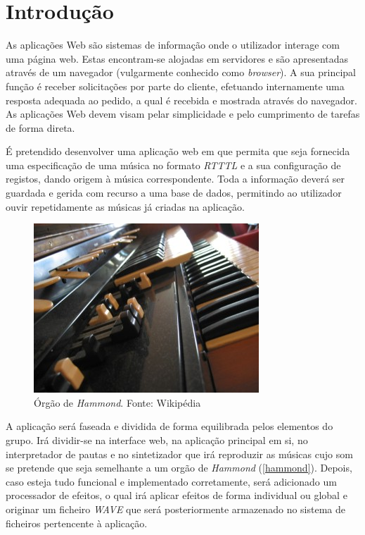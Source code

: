 \documentclass[11pt,openany,twoside]{report}
\begin{document}
\chapter{Introdução}
As aplicações Web são sistemas de informação onde o utilizador interage com uma página web. Estas encontram-se alojadas em servidores e são apresentadas através de um navegador (vulgarmente conhecido como \textit{browser}). A sua principal função é receber solicitações por parte do cliente, efetuando internamente uma resposta adequada ao pedido, a qual é recebida e mostrada através do navegador. As aplicações Web devem visam pelar simplicidade e pelo cumprimento de tarefas de forma direta.

É pretendido desenvolver uma aplicação web em que permita que seja fornecida uma especificação de uma música no formato \textit{RTTTL} e a sua configuração de registos, dando origem à música correspondente. Toda a informação deverá ser guardada e gerida com recurso a uma base de dados, permitindo ao utilizador ouvir repetidamente as músicas já criadas na aplicação.


\begin{figure}
 \center
 \includegraphics[scale=.4]{Hammond_l100.jpg}
 \caption{Órgão de \textit{Hammond}. Fonte: Wikipédia}
 \label{hammond}
\end{figure}

A aplicação será faseada e dividida de forma equilibrada pelos elementos do grupo. Irá dividir-se na interface web, na aplicação principal em si, no interpretador de pautas e no sintetizador que irá reproduzir as músicas cujo som se pretende que seja semelhante a um orgão de \textit{Hammond} (\autoref{hammond}). Depois, caso esteja tudo funcional e implementado corretamente, será adicionado um processador de efeitos, o qual irá aplicar efeitos de forma individual ou global e originar um ficheiro \textit{WAVE} que será posteriormente armazenado no sistema de ficheiros pertencente à aplicação.
\end{document}
